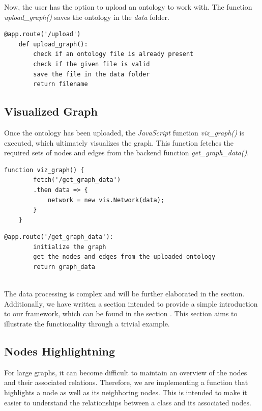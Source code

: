 Now, the user has the option to upload an ontology to work with. The function \textit{upload\_graph()} saves the ontology in the \textit{data} folder.

\begin{lstlisting}[caption={Uploading a Ontology file},captionpos=b]
    @app.route('/upload')
    def upload_graph():
        check if an ontology file is already present
        check if the given file is valid 
        save the file in the data folder
        return filename
\end{lstlisting}


\subsection{Visualized Graph}
Once the ontology has been uploaded, the \textit{JavaScript} function \textit{viz\_graph()} is executed, 
which ultimately visualizes the graph. This function fetches the required sets of nodes and edges from the backend function \textit{get\_graph\_data()}.

\begin{lstlisting}[caption={Function for visualizing the graph},captionpos=b]
    function viz_graph() {
        fetch('/get_graph_data')
        .then data => {
            network = new vis.Network(data);
        }
    }
\end{lstlisting}

\begin{lstlisting}[caption={Proccesing through the ontology},captionpos=b]
    @app.route('/get_graph_data'):
        initialize the graph
        get the nodes and edges from the uploaded ontology
        return graph_data
        
\end{lstlisting}



The data processing is complex and will be further elaborated in the  section. 
Additionally, we have written a section intended to provide a simple introduction to our framework, which can be found in the section 
 . This section aims to illustrate the functionality through a trivial example.
\subsection{Nodes Highlightning}

For large graphs, it can become difficult to maintain an overview of the nodes and their associated relations. 
Therefore, we are implementing a function that highlights a node as well as its neighboring nodes. 
This is intended to make it easier to understand the relationships between a class and its associated nodes. 

